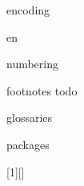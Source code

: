 \usepackage[parent]{currfile}
\usepackage{currfile-abspath}


{encoding}




%
%
{en}


%
%
{numbering}


%
%
{footnotes}
{todo}

{glossaries}



\usepackage{hyperref}

\usepackage{graphicx}
\usepackage{caption}

\usepackage{fancybox,framed}

{packages}



\usepackage{color}
\usepackage{listings}

\lstset{frame=single}

\lstset{language=C}

[1][]
{
    \lstset{language=tex}
    \lstset{#1} %
}
{
}

\lstset{%
    frame = single,
    basicstyle = \ttfamily\small,
    language = C
}




\usepackage{fourier} %


